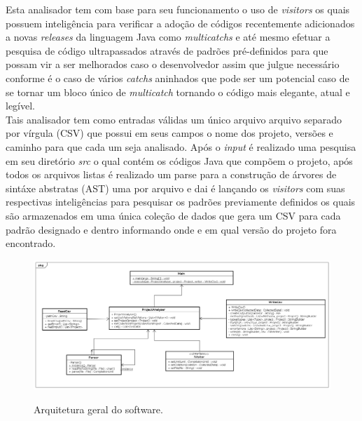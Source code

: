 Esta analisador tem com base para seu funcionamento o uso de {\it visitors}  \cite{Gamma:1995:DPE:186897} os quais possuem inteligência para verificar a adoção de códigos recentemente adicionados a novas {\it releases} da linguagem Java como {\it multicatchs} e até mesmo efetuar a pesquisa de código ultrapassados através de padrões pré-definidos para que possam vir a ser melhorados caso o desenvolvedor assim que julgue necessário conforme é o caso de vários {\it catchs} aninhados que pode ser um potencial caso de se tornar um bloco único de {\it multicatch} tornando o código mais elegante, atual e legível.\\

Tais analisador tem como entradas válidas um único arquivo arquivo separado por vírgula (CSV) que possui em seus campos o nome dos projeto, versões e caminho para que cada um seja analisado. Após o {\it input} é realizado uma pesquisa em seu diretório \textit{src} o qual contém os códigos Java que compõem o projeto, após todos os arquivos listas é realizado um parse para a construção de árvores de sintáxe abstratas (AST) uma por arquivo e dai é lançando os {\it visitors}  \cite{Gamma:1995:DPE:186897} com suas respectivas inteligências para pesquisar os padrões previamente definidos os quais são armazenados em uma única coleção de dados que gera um CSV para cada padrão designado e dentro informando onde e em qual versão do projeto fora encontrado.\\
	
\begin{figure}[h]
	\center
	\includegraphics[width=1.0\textwidth]{Imagens/Arquitetura}
	\label{fig:arquiteturaVisitor}
	\caption{Arquitetura geral do software.}
\end{figure}	

\clearpage
